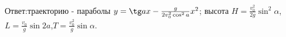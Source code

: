 Ответ:траекторию - параболы $y=\tg a x - \frac{g}{2v^2_{0}\cos^2 a}x^2$; высота
$H=\frac{v^2_{0}}{2g}\sin^2 \alpha$,$L=\frac{v_{0}}{g}\sin 2a$,$T=\frac{v^2_{0}}{g}\sin\alpha$.
